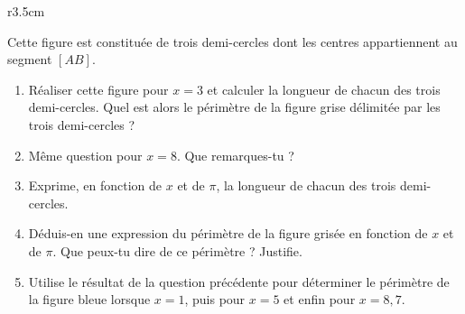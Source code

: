 
\begin{exercice}\label{exosmath-0810}

    \begin{wrapfigure}[4]{r}{3.5cm}
   \vspace{-0.5cm}        %
   \centering
   
\end{wrapfigure}

Cette figure est constituée de trois demi-cercles dont les centres appartiennent au segment $[AB]$.

\begin{enumerate}
    \item
Réaliser cette figure pour $x = 3$ et calculer la longueur de chacun des trois demi-cercles. Quel est alors le périmètre de la figure grise délimitée par les trois demi-cercles ?
\item
 Même question pour $x = 8$.  Que remarques-tu ?
\item
 Exprime, en fonction de $x$ et de \( \pi\), la longueur de chacun des trois demi-cercles.
\item
 Déduis-en une expression du périmètre de la figure grisée en fonction de $x$ et de \( \pi\).  Que peux-tu dire de ce périmètre ? Justifie.
\item
 Utilise le résultat de la question précédente pour déterminer le périmètre de la figure bleue lorsque $x = 1$, puis pour $x = 5$ et enfin pour $x = 8,7$.
\end{enumerate}

\end{exercice}
